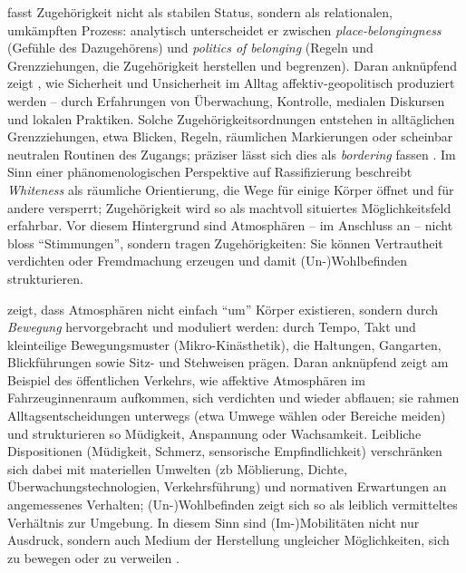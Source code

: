\textcite{antonsichSearchingBelongingAnalytical2010} fasst Zugehörigkeit nicht als stabilen Status, sondern als relationalen, umkämpften Prozess: analytisch unterscheidet er zwischen \emph{place-belongingness} (Gefühle des Dazugehörens) und \emph{politics of belonging} (Regeln und Grenzziehungen, die Zugehörigkeit herstellen und begrenzen). Daran anknüpfend zeigt \textcite{painGlobalizedFearEmotional2009}, wie Sicherheit und Unsicherheit im Alltag affektiv-geopolitisch produziert werden -- durch Erfahrungen von Überwachung, Kontrolle, medialen Diskursen und lokalen Praktiken. Solche Zugehörigkeitsordnungen entstehen in alltäglichen Grenzziehungen, etwa Blicken, Regeln, räumlichen Markierungen oder scheinbar neutralen Routinen des Zugangs; präziser lässt sich dies als \emph{bordering} fassen \parencite[\gls{vgl}][]{yuval-davisBelongingPoliticsBelonging2006}. Im Sinn einer phänomenologischen Perspektive auf Rassifizierung beschreibt \textcite{ahmedPhenomenologyWhiteness2007} \emph{Whiteness} als räumliche Orientierung, die Wege für einige Körper öffnet und für andere versperrt; Zugehörigkeit wird so als machtvoll situiertes Möglichkeitsfeld erfahrbar. Vor diesem Hintergrund sind Atmosphären -- im Anschluss an \textcite{andersonAffectiveAtmospheres2009} -- nicht bloss \enquote{Stimmungen}, sondern tragen Zugehörigkeiten: Sie können Vertrautheit verdichten oder Fremdmachung erzeugen und damit (Un-)Wohlbefinden strukturieren.

\textcite{mccormackEngineeringAffectiveAtmospheres2008} zeigt, dass Atmosphären nicht einfach \enquote{um} Körper existieren, sondern durch \emph{Bewegung} hervorgebracht und moduliert werden: durch Tempo, Takt und kleinteilige Bewegungsmuster (Mikro-Kinästhetik), die Haltungen, Gangarten, Blickführungen sowie Sitz- und Stehweisen prägen. Daran anknüpfend zeigt \textcite{bissellPassengerMobilitiesAffective2010} am Beispiel des öffentlichen Verkehrs, wie affektive Atmosphären im Fahrzeuginnenraum aufkommen, sich verdichten und wieder abflauen; sie rahmen Alltagsentscheidungen unterwegs (etwa Umwege wählen oder Bereiche meiden) und strukturieren so Müdigkeit, Anspannung oder Wachsamkeit. Leibliche Dispositionen (Müdigkeit, Schmerz, sensorische Empfindlichkeit) verschränken sich dabei mit materiellen Umwelten (\gls{zb} Möblierung, Dichte, Überwachungstechnologien, Verkehrsführung) und normativen Erwartungen an angemessenes Verhalten; (Un-)Wohlbefinden zeigt sich so als leiblich vermitteltes Verhältnis zur Umgebung. In diesem Sinn sind (Im-)Mobilitäten nicht nur Ausdruck, sondern auch Medium der Herstellung ungleicher Möglichkeiten, sich zu bewegen oder zu verweilen \parencite[\gls{vgl}][]{ahmedPhenomenologyWhiteness2007}.

